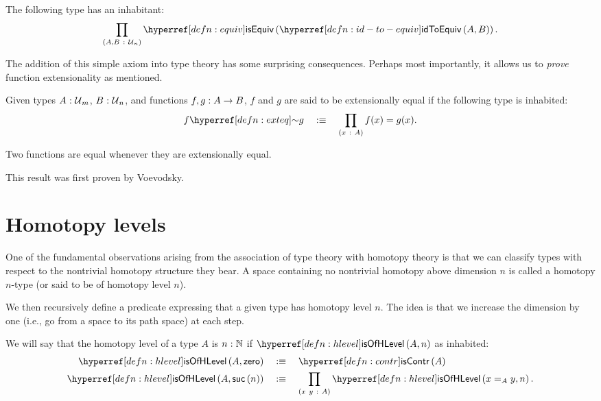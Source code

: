 \begin{ax}[Univalence]\label{ax:ua}
  The following type has an inhabitant:
  \begin{equation*}
    \pity{A, B}{\univ{}_n}{\isequiv{\idtoeqv{A}{B}}}.
  \end{equation*}
\end{ax}

The addition of this simple axiom into type theory has some surprising consequences.
Perhaps most importantly, it allows us to \emph{prove} function extensionality as
mentioned.
\begin{defn}\label{defn:exteq}
  Given types $A\hspace{0.1mm}:\hspace{0.1mm}\mathcal{U}{}_m$, $B\hspace{0.1mm}:\hspace{0.1mm}\mathcal{U}{}_n$, and functions
  $f, g:A \rightarrow B$, $f$ and $g$ are said to be extensionally equal if the following
  type is inhabited:
  \begin{equation*}
    \exteq{f}{g} \quad\is\quad \pity{x}{A}{f(x) = g(x)}.
  \end{equation*}
\end{defn}

\begin{prop}\label{prop:funext}
  Two functions are equal whenever they are extensionally equal.
\end{prop}

This result was first proven by Voevodsky.

\section{Homotopy levels}

One of the fundamental observations arising from the association of type theory with
homotopy theory is that we can classify types with respect to the nontrivial homotopy
structure they bear. A space containing no nontrivial homotopy above dimension $n$ is
called a homotopy $n$-type (or said to be of homotopy level $n$).

We then recursively define a predicate expressing that a given type has homotopy level
$n$. The idea is that we increase the dimension by one (i.e., go from a space to its path
space) at each step.
\begin{defn}\label{defn:hlevel}
  We will say that the homotopy level of a type $A$ is $n\hspace{0.1mm}:\hspace{0.1mm}\mathbb{N}$ if
  $\isofhlevel{A}{n}$ as inhabited:
  \begin{align*}
    \isofhlevel{A}{\zero{}} &\quad\is\quad \iscontr{A}\\
    \isofhlevel{A}{\suc{n}} &\quad\is\quad \pity{x~y}{A}{\isofhlevel{x =_A y}{n}}.
  \end{align*}
\end{defn}

